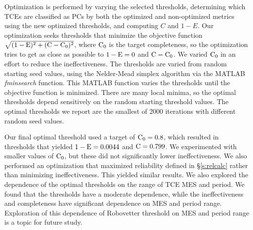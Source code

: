 Optimization is performed by varying the selected thresholds, determining which TCEs are classified as PCs by both the optimized and non-optimized metrics using the new optimized thresholds, and computing $C$ and $1-E$.  Our optimization seeks thresholds that minimize the objective function $\sqrt{{(\rm 1-E})^2 + ({\rm C} - {\rm C}_0)^2}$, where ${\rm C}_0$ is the target completeness, so the optimization tries to get as close as possible to ${\rm 1-E} = 0$ and ${\rm C} = {\rm C}_0$.  We varied ${\rm C}_0$ in an effort to reduce the ineffectiveness. The thresholds are varied from random starting seed values, using the Nelder-Mead simplex algorithm via the \textsc{MATLAB} {\it fminsearch} function.  This \textsc{MATLAB} function varies the thresholds until the objective function is minimized.  There are many local minima, so the optimal thresholds depend sensitively on the random starting threshold values.  The optimal thresholds we report are the smallest of 2000 iterations with different random seed values.

Our final optimal threshold used a target of ${\rm C}_0 = 0.8$, which resulted in thresholds that yielded ${\rm 1-E} = 0.0044$ and ${\rm C} = 0.799$.  We experimented with smaller values of ${\rm C}_0$, but these did not significantly lower ineffectiveness.   We also performed an optimization that maximized reliability defined in \S\ref{s:relcalc} rather than minimizing ineffectiveness. This yielded similar results. We also explored the dependence of the optimal thresholds on the range of TCE MES and period.  We found that the thresholds have a moderate dependence, while the ineffectiveness and completeness have significant dependence on MES and period range. Exploration of this dependence of Robovetter threshold on MES and period range is a topic for future study.




